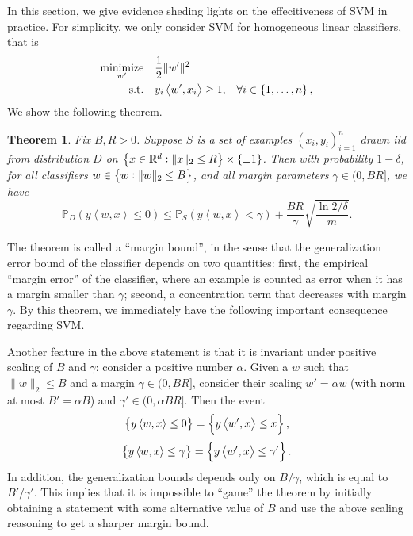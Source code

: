 \documentclass{article}
\newtheorem{theorem}{Theorem}
\DeclareMathOperator*{\minimize}{{\rm minimize}}
\DeclareMathOperator*{\st}{{\rm s.t.}}
\newcommand{\RR}{\mathbb{R}} %
\newcommand{\PP}{\mathbb{P}}
\newcommand{\inner}[2]{\left\langle #1,#2 \right\rangle}
\begin{document}
 In this section, we give evidence sheding lights on the effecitiveness of
  SVM in practice. For simplicity, we only consider SVM for homogeneous linear classifiers, that is
  \begin{align}
    \minimize_{w'} \quad & \frac12 \| w' \|^2 & \label{eqn:svm-h} \\
      \st \quad &  y_i \inner{w'}{x_i} \geq 1, &\forall i \in \cbr{1,\ldots,n}, \nonumber
  \end{align}
  We show the following theorem.

\begin{theorem}
Fix $B, R > 0$. Suppose $S$ is a set of examples $(x_i,y_i)_{i=1}^n$ drawn iid from distribution $D$ on $\cbr{x \in \RR^d: \| x \|_2 \leq R} \times \cbr{\pm 1}$.
Then with probability $1-\delta$, for all classifiers $w \in \cbr{w: \|w\|_2 \leq B}$, and all margin parameters
$\gamma \in (0, BR]$, we have
\[
\PP_D( y \inner{w}{x} \leq 0 )
\leq \PP_S (y \inner{w}{x} < \gamma) + \frac{BR}{\gamma} \sqrt{\frac{\ln2/\delta}{m}}.
\]
\label{thm:mb-l2}
\end{theorem}

The theorem is called a ``margin bound'', in the sense that the generalization error bound of the classifier depends on two quantities: first, the empirical ``margin error'' of the classifier, where an example is counted as error when it has a margin smaller than $\gamma$; second, a concentration term that decreases with margin $\gamma$. By this theorem, we immediately have the following
important consequence regarding SVM.

Another feature in the above statement is that it is invariant under positive scaling of $B$ and $\gamma$: consider a positive number $\alpha$. Given a $w$ such that $\| w \|_2 \leq B$ and a margin $\gamma \in (0, BR]$, consider their scaling $w' = \alpha w$ (with norm at most $B' = \alpha B$)  and $\gamma' \in (0,\alpha BR]$. Then
the event
\[ \cbr{y \inner{w}{x} \leq 0} = \cbr{y \inner{w'}{x} \leq x }, \]
\[ \cbr{y \inner{w}{x} \leq \gamma} = \cbr{y \inner{w'}{x} \leq \gamma'}. \]
In addition, the generalization bounds depends only on $B/\gamma$, which is equal
to $B'/\gamma'$. This implies that it is impossible to ``game'' the theorem by initially obtaining a statement with some alternative value of $B$ and use the above scaling reasoning to get a sharper margin bound.

\end{document}
